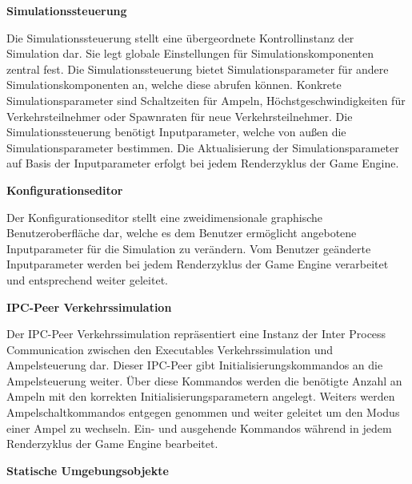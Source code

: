 \begin{flushleft}
\textbf{Simulationssteuerung}
\end{flushleft}
\vspace{-0.3 cm}

Die Simulationssteuerung stellt eine übergeordnete Kontrollinstanz der Simulation dar. Sie legt globale Einstellungen für Simulationskomponenten zentral fest. Die Simulationssteuerung bietet Simulationsparameter für andere Simulationskomponenten an, welche diese abrufen können. Konkrete Simulationsparameter sind Schaltzeiten für Ampeln, Höchstgeschwindigkeiten für Verkehrsteilnehmer oder Spawnraten für neue Verkehrsteilnehmer. Die Simulationssteuerung benötigt Inputparameter, welche von außen die Simulationsparameter bestimmen. Die Aktualisierung der Simulationsparameter auf Basis der Inputparameter erfolgt bei jedem Renderzyklus der Game Engine.

\begin{flushleft}
\textbf{Konfigurationseditor}
\end{flushleft}
\vspace{-0.3 cm}

Der Konfigurationseditor stellt eine zweidimensionale graphische Benutzeroberfläche dar, welche es dem Benutzer ermöglicht angebotene Inputparameter für die Simulation zu verändern. Vom Benutzer geänderte Inputparameter werden bei jedem Renderzyklus der Game Engine verarbeitet und entsprechend weiter geleitet.

\begin{flushleft}
\textbf{IPC-Peer Verkehrssimulation}
\end{flushleft}
\vspace{-0.3 cm}

Der IPC-Peer Verkehrssimulation repräsentiert eine Instanz der Inter Process Communication zwischen den Executables Verkehrssimulation und Ampelsteuerung dar. Dieser IPC-Peer gibt Initialisierungskommandos an die Ampelsteuerung weiter. Über diese Kommandos werden die benötigte Anzahl an Ampeln mit den korrekten Initialisierungsparametern angelegt. Weiters werden Ampelschaltkommandos entgegen genommen und weiter geleitet um den Modus einer Ampel zu wechseln. Ein- und ausgehende Kommandos während in jedem Renderzyklus der Game Engine bearbeitet.

\begin{flushleft}
\textbf{Statische Umgebungsobjekte}
\end{flushleft}
\vspace{-0.3 cm}

